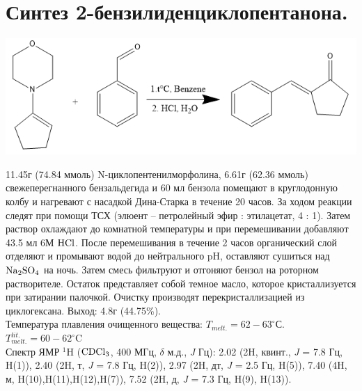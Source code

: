 \documentclass[a4paper]{article}
\begin{document}
\section{Синтез 2-бензилиденциклопентанона.}
\begin{center}
\includegraphics[scale=0.5]{pictures/1.png}
\end{center}
11.45г (74.84 ммоль) N-циклопентенилморфолина, 6.61г (62.36 ммоль) свежеперегнанного бензальдегида и 60 мл бензола помещают в круглодонную колбу и нагревают с насадкой Дина-Старка в течение 20 часов. За ходом реакции следят при помощи ТСХ (элюент -- петролейный эфир : этилацетат, 4 : 1).
Затем раствор охлаждают до комнатной температуры и при перемешивании добавляют 43.5 мл 6М $\ce{HCl}$. После перемешивания в течение 2 часов органический слой отделяют и промывают водой до нейтрального pH, оставляют сушиться над $\ce{Na2SO4}$ на ночь. Затем смесь фильтруют и отгоняют бензол на роторном растворителе. Остаток представляет собой темное масло, которое кристаллизуется при затирании палочкой. Очистку производят перекристаллизацией из циклогексана. Выход: 4.8г (44.75\%).\\
Температура плавления очищенного вещества: $T_{melt.} = 62 - 63^{\circ}$С. $T_{melt.}^{lit.} = 60 - 62^{\circ}$C \cite{takeishi2004} \\
Спектр ЯМР $^{1}$H ($\ce{CDCl3}$, 400 МГц, $\delta$ м.д., \textit{J} Гц):   2.02 (2H, квинт., \textit{J} = 7.8 Гц, H(1)), 2.40 (2H, т, \textit{J} = 7.8 Гц, H(2)), 2.97 (2H, дт, \textit{J} = 2.5 Гц, H(5)), 7.40 (4H, м, H(10),H(11),H(12),H(7)), 7.52 (2H, д, \textit{J} = 7.3 Гц, H(9), H(13)). 
\end{document}
